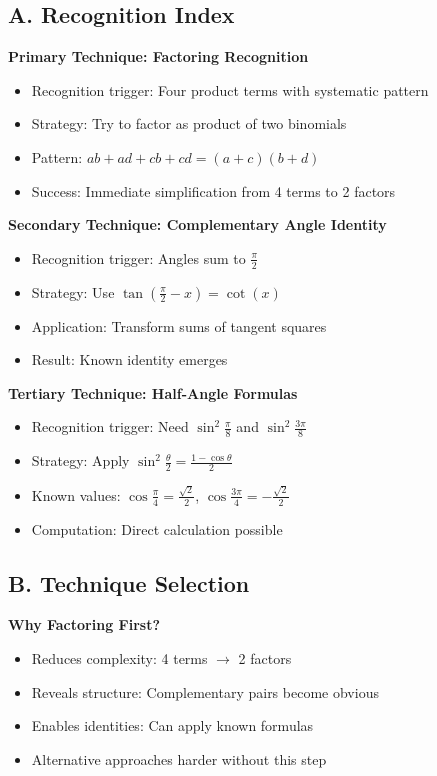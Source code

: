 \documentclass[12pt]{article}
\begin{document}
\begin{techniquesbox}

\subsection*{A. Recognition Index}

\textbf{Primary Technique: Factoring Recognition}
\begin{itemize}
    \item Recognition trigger: Four product terms with systematic pattern
    \item Strategy: Try to factor as product of two binomials
    \item Pattern: $ab + ad + cb + cd = (a+c)(b+d)$
    \item Success: Immediate simplification from 4 terms to 2 factors
\end{itemize}

\textbf{Secondary Technique: Complementary Angle Identity}
\begin{itemize}
    \item Recognition trigger: Angles sum to $\frac{\pi}{2}$
    \item Strategy: Use $\tan(\frac{\pi}{2}-x) = \cot(x)$
    \item Application: Transform sums of tangent squares
    \item Result: Known identity emerges
\end{itemize}

\textbf{Tertiary Technique: Half-Angle Formulas}
\begin{itemize}
    \item Recognition trigger: Need $\sin^2\frac{\pi}{8}$ and $\sin^2\frac{3\pi}{8}$
    \item Strategy: Apply $\sin^2\frac{\theta}{2} = \frac{1-\cos\theta}{2}$
    \item Known values: $\cos\frac{\pi}{4} = \frac{\sqrt{2}}{2}$, $\cos\frac{3\pi}{4} = -\frac{\sqrt{2}}{2}$
    \item Computation: Direct calculation possible
\end{itemize}

\subsection*{B. Technique Selection}

\textbf{Why Factoring First?}
\begin{itemize}
    \item Reduces complexity: 4 terms $\to$ 2 factors
    \item Reveals structure: Complementary pairs become obvious
    \item Enables identities: Can apply known formulas
    \item Alternative approaches harder without this step
\end{itemize}


\end{techniquesbox}
\end{document}
